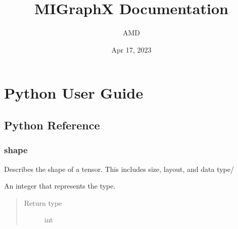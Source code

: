 \documentclass[letterpaper,10pt,english]{sphinxmanual}
\title{MIGraphX Documentation}
\date{Apr 17, 2023}
\author{AMD}
\begin{document}
\pagestyle{empty}
\sphinxmaketitle
\pagestyle{plain}
\sphinxtableofcontents
\pagestyle{normal}
\label{\detokenize{index::doc}}



\chapter{Python User Guide}
\label{\detokenize{py_user_guide:python-user-guide}}\label{\detokenize{py_user_guide::doc}}\label{\detokenize{reference/py:module-migraphx}}

\section{Python Reference}
\label{\detokenize{reference/py:python-reference}}\label{\detokenize{reference/py::doc}}

\subsection{shape}
\label{\detokenize{reference/py:shape}}

\begin{fulllineitems}
\label{\detokenize{reference/py:migraphx.shape}}
\sphinxAtStartPar
Describes the shape of a tensor. This includes size, layout, and data type/

\end{fulllineitems}


\begin{fulllineitems}
\label{\detokenize{reference/py:migraphx.type}}
\sphinxAtStartPar
An integer that represents the type.
\begin{quote}\begin{description}
\item[{Return type}] \leavevmode
\sphinxAtStartPar
int

\end{description}\end{quote}

\end{fulllineitems}
\end{document}
